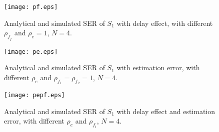 \documentclass[onecolumn,letterpaper,11pt,draftclsnofoot]{IEEEtran}
\begin{document}
\begin{figure}[h!]
\centering
\texttt{[image: pf.eps]}
\caption{Analytical and simulated SER of $S_1$ with delay effect,
with different $\rho_{f_j}$ and $\rho_e=1$, $N=4$.} \label{fig:1}
\end{figure}

\begin{figure}[h!]
\centering
\texttt{[image: pe.eps]}
\caption{Analytical and simulated SER of $S_1$ with estimation
error, with different $\rho_e$ and $\rho_{f_1}=\rho_{f_2}=1$,
$N=4$.} \label{fig:2}
\end{figure}

\begin{figure}[h!]
\centering
\texttt{[image: pepf.eps]}
\caption{Analytical and simulated SER of $S_1$ with delay effect and
estimation error, with different $\rho_e$ and $\rho_{f_i}$, $N=4$.}
\label{fig:3}
\end{figure}
\end{document}
